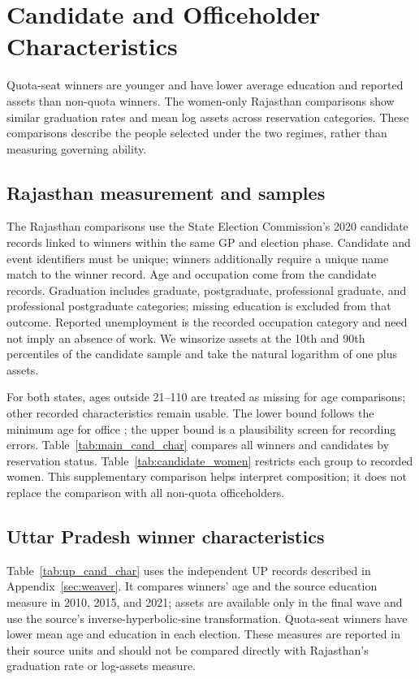 \clearpage
\section{Candidate and Officeholder Characteristics}\label{sec:app_characteristics}
\suppressfloats[t]

Quota-seat winners are younger and have lower average education and reported assets than non-quota winners. The women-only Rajasthan comparisons show similar graduation rates and mean log assets across reservation categories. These comparisons describe the people selected under the two regimes, rather than measuring governing ability.

\subsection{Rajasthan measurement and samples}

The Rajasthan comparisons use the State Election Commission's 2020 candidate records linked to winners within the same GP and election phase. Candidate and event identifiers must be unique; winners additionally require a unique name match to the winner record. Age and occupation come from the candidate records. Graduation includes graduate, postgraduate, professional graduate, and professional postgraduate categories; missing education is excluded from that outcome. Reported unemployment is the recorded occupation category and need not imply an absence of work. We winsorize assets at the 10th and 90th percentiles of the candidate sample and take the natural logarithm of one plus assets.

For both states, ages outside 21--110 are treated as missing for age comparisons; other recorded characteristics remain usable. The lower bound follows the minimum age for office \citep{rajasthan1994act, up1947act}; the upper bound is a plausibility screen for recording errors. Table~\ref{tab:main_cand_char} compares all winners and candidates by reservation status. Table~\ref{tab:candidate_women} restricts each group to recorded women. This supplementary comparison helps interpret composition; it does not replace the comparison with all non-quota officeholders.


\FloatBarrier

\clearpage
\subsection{Uttar Pradesh winner characteristics}

Table~\ref{tab:up_cand_char} uses the independent UP records described in Appendix~\ref{sec:weaver}. It compares winners' age and the source education measure in 2010, 2015, and 2021; assets are available only in the final wave and use the source's inverse-hyperbolic-sine transformation. Quota-seat winners have lower mean age and education in each election. These measures are reported in their source units and should not be compared directly with Rajasthan's graduation rate or log-assets measure.


\FloatBarrier
